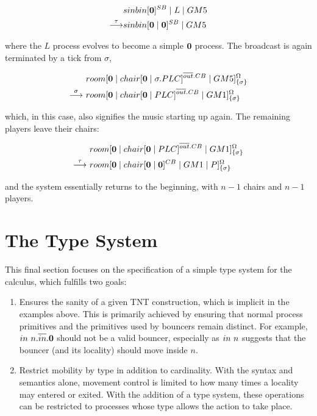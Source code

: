 \begin{equation}
\begin{aligned}
& {sinbin}[ \textbf{0} ]^{SB} \;|\; L \;|\; GM5 \\
\stackrel{\tau}{\longrightarrow} & {sinbin}[ \textbf{0} \;|\; \textbf{0} ]^{SB} \;|\; GM5
\end{aligned}
\end{equation}

\noindent where the $L$ process evolves to become a simple $\textbf{0}$
process.  The broadcast is again terminated by a tick from $\sigma$,

\begin{equation}
\begin{aligned}
&  {room}[ \textbf{0} \;|\; {chair}[ \textbf{0} \;|\; \sigma.PLC ]^{\overline{out}.CB} \;|\;
   GM5 ]^{\Omega}_{\{\sigma\}} \\
\stackrel{\sigma}{\longrightarrow}\ & {room}[ \textbf{0} \;|\; {chair}[ \textbf{0} \;|\; PLC ]^{\overline{out}.CB} \;|\;
   GM1 ]^{\Omega}_{\{\sigma\}} 
\end{aligned}
\end{equation}

\noindent which, in this case, also signifies the music starting up again.  The
remaining players leave their chairs:

\begin{equation}
\begin{aligned}
& {room}[ \textbf{0} \;|\; {chair}[ \textbf{0} \;|\; PLC ]^{\overline{out}.CB} \;|\;
   GM1 ]^{\Omega}_{\{\sigma\}}   \\
\stackrel{\tau}{\longrightarrow}\ & {room}[ \textbf{0} \;|\; {chair}[ \textbf{0} \;|\; \textbf{0} ]^{CB} \;|\;
   GM1 \;|\; P ]^{\Omega}_{\{\sigma\}} 
\end{aligned}
\end{equation}

\noindent and the system essentially returns to the beginning, with $n -
1$ chairs and $n - 1$ players.

\section{The Type System}
\label{typesys}

This final section focuses on the specification of a simple type
system for the calculus, which fulfills two goals:

\begin{enumerate}
\item Ensures the sanity of a given TNT construction, which is
  implicit in the examples above.  This is primarily achieved by
  ensuring that normal process primitives and the primitives used by
  bouncers remain distinct.  For example,
  $in\ n.\overline{in}.\textbf{0}$ should not be a valid bouncer,
  especially as $in\ n$ suggests that the bouncer (and its locality)
  should move inside $n$.
\item Restrict mobility by type in addition to cardinality.  With the
  syntax and semantics alone, movement control is limited to how many
  times a locality may entered or exited.  With the addition of a type
  system, these operations can be restricted to processes whose type
  allows the action to take place.
\end{enumerate}

